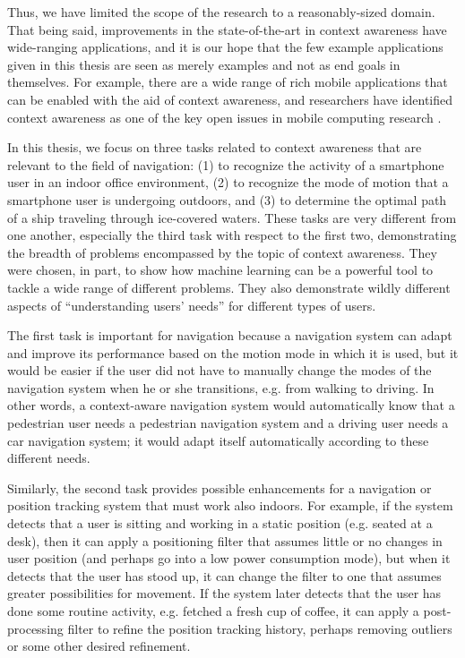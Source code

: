 Thus, we have limited the scope of the research to a reasonably-sized domain. That being said, improvements in the state-of-the-art in context awareness have wide-ranging applications, and it is our hope that the few example applications given in this thesis are seen as merely examples and not as end goals in themselves. For example, there are a wide range of rich mobile applications that can be enabled with the aid of context awareness, and researchers have identified context awareness as one of the key open issues in mobile computing research \cite{Abolfazli2014}.

In this thesis, we focus on three tasks related to context awareness that are relevant to the field of navigation: (1) to recognize the activity of a smartphone user in an indoor office environment, (2) to recognize the mode of motion that a smartphone user is undergoing outdoors, and (3) to determine the optimal path of a ship traveling through ice-covered waters. These tasks are very different from one another, especially the third task with respect to the first two, demonstrating the breadth of problems encompassed by the topic of context awareness. They were chosen, in part, to show how machine learning can be a powerful tool to tackle a wide range of different problems. They also demonstrate wildly different aspects of ``understanding users' needs'' for different types of users.

The first task is important for navigation because a navigation system can adapt and improve its performance based on the motion mode in which it is used, but it would be easier if the user did not have to manually change the modes of the navigation system when he or she transitions, e.g. from walking to driving. In other words, a context-aware navigation system would automatically know that a pedestrian user needs a pedestrian navigation system and a driving user needs a car navigation system; it would adapt itself automatically according to these different needs.

Similarly, the second task provides possible enhancements for a navigation or position tracking system that must work also indoors. For example, if the system detects that a user is sitting and working in a static position (e.g. seated at a desk), then it can apply a positioning filter that assumes little or no changes in user position (and perhaps go into a low power consumption mode), but when it detects that the user has stood up, it can change the filter to one that assumes greater possibilities for movement. If the system later detects that the user has done some routine activity, e.g. fetched a fresh cup of coffee, it can apply a post-processing filter to refine the position tracking history, perhaps removing outliers or some other desired refinement.

